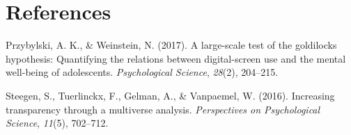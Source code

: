 \documentclass[man]{apa6}
\theoremstyle{definition}
\theoremstyle{definition}
\theoremstyle{definition}
\theoremstyle{remark}
\begin{document}
\newpage

\hypertarget{references}{%
\section{References}\label{references}}

\begingroup
\setlength{\parindent}{-0.5in}
\setlength{\leftskip}{0.5in}

\hypertarget{refs}{}
\leavevmode\hypertarget{ref-przybylski2017large}{}%
Przybylski, A. K., \& Weinstein, N. (2017). A large-scale test of the
goldilocks hypothesis: Quantifying the relations between digital-screen
use and the mental well-being of adolescents. \emph{Psychological
Science}, \emph{28}(2), 204--215.

\leavevmode\hypertarget{ref-steegen2016increasing}{}%
Steegen, S., Tuerlinckx, F., Gelman, A., \& Vanpaemel, W. (2016).
Increasing transparency through a multiverse analysis.
\emph{Perspectives on Psychological Science}, \emph{11}(5), 702--712.

\endgroup
\end{document}
